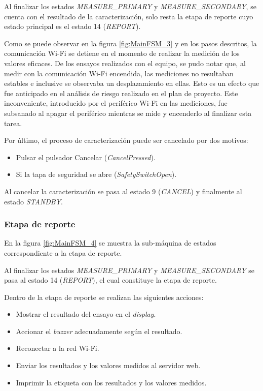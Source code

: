 Al finalizar los estados \textit{MEASURE\_PRIMARY} y \textit{MEASURE\_SECONDARY}, se cuenta con el resultado de la caracterización, solo resta la etapa de reporte cuyo estado principal es el estado 14 (\textit{REPORT}). 

Como se puede observar en la figura \ref{fig:MainFSM_3} y en los pasos descritos, la comunicación Wi-Fi se detiene en el momento de realizar la medición de los valores eficaces. De los ensayos realizados con el equipo, se pudo notar que, al medir con la comunicación Wi-Fi encendida, las mediciones no resultaban estables e inclusive se observaba un desplazamiento en ellas. Esto es un efecto que fue anticipado en el análisis de riesgo realizado en el plan de proyecto. Este inconveniente, introducido por el periférico Wi-Fi en las mediciones, fue subsanado al apagar el periférico mientras se mide y encenderlo al finalizar esta tarea.

Por último, el proceso de caracterización puede ser cancelado por dos motivos: 
\begin{itemize}
 	\item Pulsar el pulsador Cancelar (\textit{CancelPressed}).
	\item Si la tapa de seguridad se abre (\textit{SafetySwitchOpen}).	
\end{itemize}
Al cancelar la caracterización se pasa al estado 9 (\textit{CANCEL}) y finalmente al estado \textit{STANDBY}.

\subsubsection{Etapa de reporte}
\label{subsubsec:EtRep}

En la figura \ref{fig:MainFSM_4} se muestra la sub-máquina de estados correspondiente a la etapa de reporte. 

Al finalizar los estados \textit{MEASURE\_PRIMARY} y \textit{MEASURE\_SECONDARY} se pasa al estado 14 (\textit{REPORT}), el cual constituye la etapa de reporte.

Dentro de la etapa de reporte se realizan las siguientes acciones:
\begin{itemize}
\item Mostrar el resultado del ensayo en el \textit{display}.
\item Accionar el \textit{buzzer} adecuadamente según el resultado.
\item Reconectar a la red Wi-Fi.
\item Enviar los resultados y los valores medidos al servidor web.
\item Imprimir la etiqueta con los resultados y los valores medidos.
\end{itemize}

